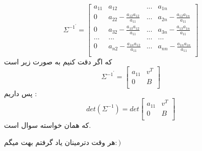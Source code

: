 \[
    {\Sigma^{-1^{\prime}}} = \begin{bmatrix}
    a_{11} & a_{12} & ... & a_{1n} \\
    0      & a_{22} -  \frac{a_{12}a_{12}}{a_{11}}& ... & a_{2n} - \frac{a_{12}a_{1n}}{a_{11}}\\
    0      & a_{32} - \frac{a_{13}a_{12}}{a_{11}} & ... & a_{3n} - \frac{a_{13}a_{1n}}{a_{11}}\\
    ... & ... & ... & ... \\
    0      & a_{n2}- \frac{a_{1n}a_{12}}{a_{11}} & ... & a_{nn}- \frac{a_{1n}a_{1n}}{a_{11}} \\
\end{bmatrix}
\]
که اگر دقت کنیم به صورت زیر است
\[ 
    {\Sigma^{-1^{\prime}}} = \begin{bmatrix}
        a_{11} & v^{T} \\
        0 & B \\
    \end{bmatrix}
\]
پس داریم :\\
\[ det(\Sigma^{-1}) = det \begin{bmatrix}
    a_{11} & v^{T} \\
    0 & B \\
\end{bmatrix}
\]
که همان خواسته سوال است.\\

\parte{}

هر وقت دترمینان یاد گرفتم بهت میگم$:)$\\
